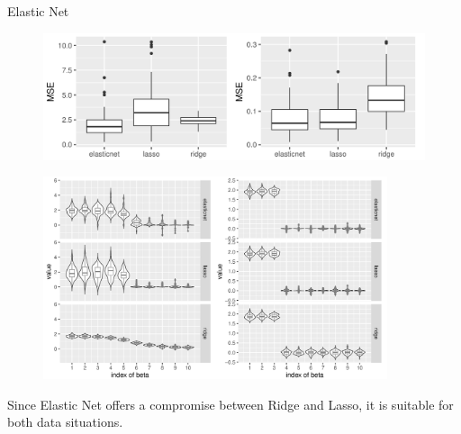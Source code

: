 \begin{vbframe} {Elastic Net}
\begin{figure}
\includegraphics[width=1\textwidth]{figure_man/elastic-net02.png}\\
\end{figure}

\framebreak

\begin{figure}
\includegraphics[width=0.9\textwidth]{figure_man/elastic-net03.png}\\
\end{figure}


\normalsize
Since Elastic Net offers a compromise between Ridge and Lasso, it is suitable for both data situations.

\end{vbframe}



